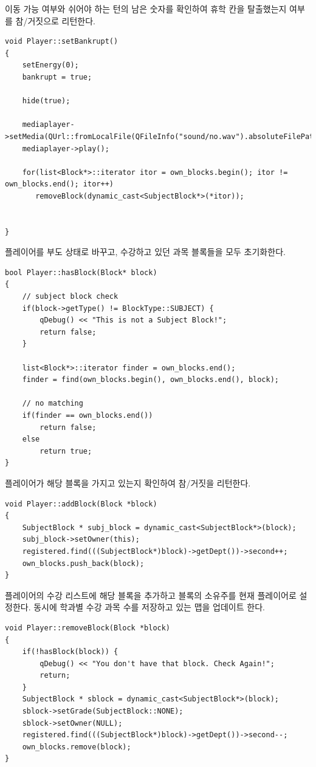 \documentclass[10pt,oneside,a4paper,titlepage]{article}
\begin{document}
이동 가능 여부와 쉬어야 하는 턴의 남은 숫자를 확인하여 휴학 칸을 탈출했는지 여부를 참/거짓으로 리턴한다.\\


\begin{lstlisting}
void Player::setBankrupt()
{
    setEnergy(0);
    bankrupt = true;

    hide(true);

    mediaplayer->setMedia(QUrl::fromLocalFile(QFileInfo("sound/no.wav").absoluteFilePath()));
    mediaplayer->play();

    for(list<Block*>::iterator itor = own_blocks.begin(); itor != own_blocks.end(); itor++)
       removeBlock(dynamic_cast<SubjectBlock*>(*itor));


}
\end{lstlisting}

플레이어를 부도 상태로 바꾸고, 수강하고 있던 과목 블록들을 모두 초기화한다.\\

\begin{lstlisting}
bool Player::hasBlock(Block* block)
{
    // subject block check
    if(block->getType() != BlockType::SUBJECT) {
        qDebug() << "This is not a Subject Block!";
        return false;
    }

    list<Block*>::iterator finder = own_blocks.end();
    finder = find(own_blocks.begin(), own_blocks.end(), block);

    // no matching
    if(finder == own_blocks.end())
        return false;
    else
        return true;
}
\end{lstlisting}

플레이어가 해당 블록을 가지고 있는지 확인하여 참/거짓을 리턴한다.\\


\begin{lstlisting}
void Player::addBlock(Block *block)
{
    SubjectBlock * subj_block = dynamic_cast<SubjectBlock*>(block);
    subj_block->setOwner(this);
    registered.find(((SubjectBlock*)block)->getDept())->second++;
    own_blocks.push_back(block);
}
\end{lstlisting}

플레이어의 수강 리스트에 해당 블록을 추가하고 블록의 소유주를 현재 플레이어로 설정한다. 동시에 학과별 수강 과목 수를 저장하고 있는 맵을 업데이트 한다.\\

\begin{lstlisting}
void Player::removeBlock(Block *block)
{
    if(!hasBlock(block)) {
        qDebug() << "You don't have that block. Check Again!";
        return;
    }
    SubjectBlock * sblock = dynamic_cast<SubjectBlock*>(block);
    sblock->setGrade(SubjectBlock::NONE);
    sblock->setOwner(NULL);
    registered.find(((SubjectBlock*)block)->getDept())->second--;
    own_blocks.remove(block);
}
\end{lstlisting}
\end{document}
